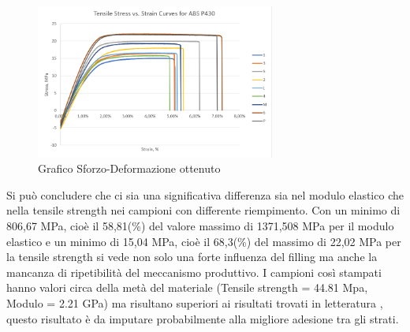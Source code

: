 \documentclass[%
corpo=11pt,
twoside,
 stile=classica,
oldstyle,
greek,%
]{toptesi}
\begin{document}
	\begin{figure}
	\centering
	\includegraphics[width=0.7\textwidth]{Screen/curvesmaterial.png}
	\caption{Grafico Sforzo-Deformazione ottenuto }
	\label{fig:graficomateriale}
\end{figure} 

Si può concludere che ci sia una significativa differenza sia nel modulo elastico che nella tensile strength nei campioni con differente riempimento. Con un minimo di 806,67 MPa, cioè il 58,81(\%) del valore massimo di 1371,508 MPa per il modulo elastico e un minimo di 15,04 MPa, cioè il 68,3(\%) del massimo di 22,02 MPa per la tensile strength si vede non solo una forte influenza del filling ma anche la mancanza di ripetibilità del meccanismo produttivo. 
I campioni così stampati hanno valori circa della metà del materiale (Tensile strength = 44.81 Mpa, Modulo = 2.21 GPa) ma risultano superiori ai risultati trovati in letteratura \cite{P430paper}, questo risultato è da imputare probabilmente alla migliore adesione tra gli strati.
\end{document}
